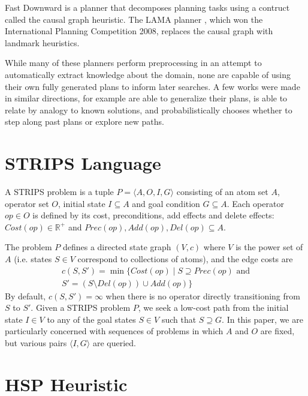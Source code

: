 \documentclass[letterpaper]{article}
\begin{document}
Fast Downward \cite{helmert2006fast} is a planner that decomposes planning tasks using a contruct called the causal graph heuristic. The LAMA planner \cite{richter2010lama}, which won the International Planning Competition 2008, replaces the causal graph with landmark heuristics.

While many of these planners perform preprocessing in an attempt to automatically extract knowledge about the domain, none are capable of using their own fully generated plans to inform later searches. A few works were made in similar directions, for example \cite{fikes1972learning} are able to generalize their plans, \cite{veloso1992learning} is able to relate by analogy to known solutions, and \cite{borrajo2012probabilistically} probabilistically chooses whether to step along past plans or explore new paths.

\section{STRIPS Language}

A STRIPS problem is a tuple $P = \langle A,O,I,G\rangle$ consisting of an atom set $A$, operator set $O$, initial state $I \subseteq A$ and goal condition $G \subseteq A$.
Each operator $op\in O$ is defined by its cost, preconditions, add effects and delete effects: $Cost(op) \in \mathbb{R}^+$ and $Prec(op),Add(op),Del(op) \subseteq A$.

The problem $P$ defines a directed state graph $(V,c)$ where $V$ is the power set of $A$ (i.e. states $S\in V$ correspond to collections of atoms), and the edge costs are
\begin{eqnarray*} c(S,S') = \min\{Cost(op) \mid S\supseteq Prec(op)\text{ and}
\\S' = \left(S \setminus Del(op)\right) \cup Add(op)\} \end{eqnarray*}
By default, $c(S,S') = \infty$ when there is no operator directly transitioning from $S$ to $S'$.
Given a STRIPS problem $P$, we seek a low-cost path from the initial state $I\in V$ to any of the goal states $S\in V$ such that $S \supseteq G$. In this paper, we are particularly concerned with sequences of problems in which $A$ and $O$ are fixed, but various pairs $\langle I,G\rangle$ are queried.

\section{HSP Heuristic}
\end{document}
